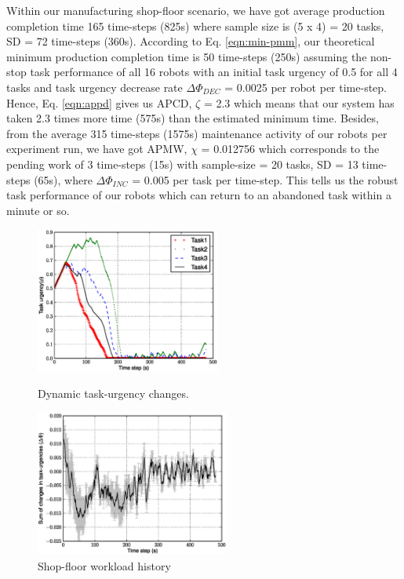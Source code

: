 \documentclass{llncs}
\begin{document}
Within our manufacturing shop-floor scenario, we have got average production completion time 165 time-steps (825s) where sample size is (5 x 4) =  20 tasks, SD = 72 time-steps (360s). According to Eq. \ref{eqn:min-pmm}, our theoretical minimum  production completion time is 50 time-steps (250s) assuming the non-stop task performance of all 16 robots with an initial task urgency of 0.5 for all 4 tasks and  task urgency decrease rate $\Delta \Phi_{DEC	}$ = 0.0025 per robot per time-step. Hence, Eq. \ref{eqn:appd} gives us APCD, $\zeta$ = 2.3 which means that our system has taken 2.3 times more time (575s) than the estimated minimum time.
Besides,  from the average 315 time-steps (1575s) maintenance activity of our robots per experiment run, we have got  APMW, $\chi$ = 0.012756  which corresponds to the pending work of 3 time-steps (15s) with sample-size = 20 tasks, SD = 13 time-steps (65s), where $\Delta \Phi_{INC}$ = 0.005 per task per time-step. This tells us the robust task performance of our robots which can return to an abandoned task within a minute or so.
\begin{figure}
\begin{minipage}[t]{0.48\linewidth}
\centering
\includegraphics[height=4.8cm, angle=0]
{images/PlotUrgencyLog-2010May10-115549.eps}
\caption{\small Dynamic task-urgency changes.}
\label{fig:raw-urgencies} %
\end{minipage}
\hspace{0.5cm}
\begin{minipage}[t]{0.48\linewidth}
\centering
\includegraphics[height=4.8cm, angle=0]{images/TaskUrgencyStat.eps}
\caption{\small Shop-floor workload history} %
\label{fig:urgency-stat} %
\end{minipage}
\end{figure}
\end{document}
